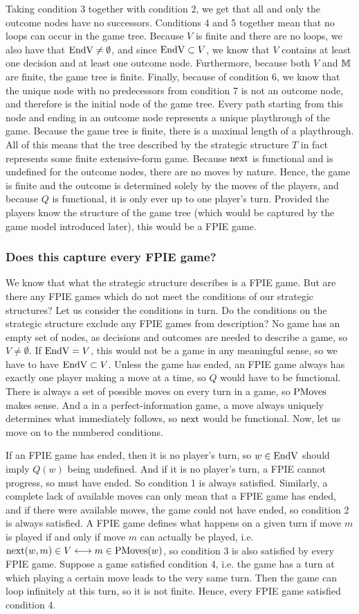 \documentclass{article}
\begin{document}
Taking condition 3 together with condition 2, we get that all and only the outcome nodes have no successors. Conditions 4 and 5 together mean that no loops can occur in the game tree. Because $V$ is finite and there are no loops, we also have that $\text{EndV}\ne\emptyset$, and since $\text{EndV}\subset V$, we know that $V$ contains at least one decision and at least one outcome node. Furthermore, because both $V$ and $\mathbb{M}$ are finite, the game tree is finite. Finally, because of condition 6, we know that the unique node with no predecessors from condition 7 is not an outcome node, and therefore is the initial node of the game tree. Every path starting from this node and ending in an outcome node represents a unique playthrough of the game. Because the game tree is finite, there is a maximal length of a playthrough. All of this means that the tree described by the strategic structure $T$ in fact represents some finite extensive-form game. Because $\text{next}$ is functional and is undefined for the outcome nodes, there are no moves by nature. Hence, the game is finite and the outcome is determined solely by the moves of the players, and because $Q$ is functional, it is only ever up to one player's turn. Provided the players know the structure of the game tree (which would be captured by the game model introduced later), this would be a FPIE game.
\subsubsection{Does this capture every FPIE game?}
We know that what the strategic structure describes is a FPIE game. But are there any FPIE games which do not meet the conditions of our strategic structures? Let us consider the conditions in turn. Do the conditions on the strategic structure exclude any FPIE games from description? No game has an empty set of nodes, as decisions and outcomes are needed to describe a game, so $V\ne\emptyset$. If $\text{EndV}=V$, this would not be a game in any meaningful sense, so we have to have $\text{EndV}\subset V$. Unless the game has ended, an FPIE game always has exactly one player making a move at a time, so $Q$ would have to be functional. There is always a set of possible moves on every turn in a game, so $\text{PMoves}$ makes sense. And a in a perfect-information game, a move always uniquely determines what immediately follows, so $\text{next}$ would be functional. Now, let us move on to the numbered conditions.

If an FPIE game has ended, then it is no player's turn, so $w\in\text{EndV}$ should imply $Q(w)$ being undefined. And if it is no player's turn, a FPIE cannot progress, so must have ended. So condition 1 is always satisfied. Similarly, a complete lack of available moves can only mean that a FPIE game has ended, and if there were available moves, the game could not have ended, so condition 2 is always satisfied. A FPIE game defines what happens on a given turn if move $m$ is played if and only if move $m$ can actually be played, i.e. $\text{next}(w,m)\in V\longleftrightarrow m\in\text{PMoves}(w)$, so condition 3 is also satisfied by every FPIE game. Suppose a game satisfied condition 4, i.e. the game has a turn at which playing a certain move leads to the very same turn. Then the game can loop infinitely at this turn, so it is not finite. Hence, every FPIE game satisfied condition 4.
\end{document}

